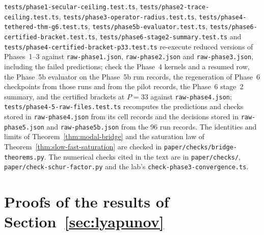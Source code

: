 \documentclass[11pt]{article}
\theoremstyle{remark}
\begin{document}
\begin{sloppypar}
\nolinkurl{tests/phase1-secular-ceiling.test.ts}, \nolinkurl{tests/phase2-trace-ceiling.test.ts}, \nolinkurl{tests/phase3-operator-radius.test.ts}, \nolinkurl{tests/phase4-tethered-thm-g6.test.ts}, \nolinkurl{tests/phase5b-evaluator.test.ts}, \nolinkurl{tests/phase6-certified-bracket.test.ts}, \nolinkurl{tests/phase6-stage2-summary.test.ts} and \nolinkurl{tests/phase4-certified-bracket-p33.test.ts} re-execute reduced versions of Phases~1--3 against \nolinkurl{raw-phase1.json}, \nolinkurl{raw-phase2.json} and \nolinkurl{raw-phase3.json}, including the failed predictions; check the Phase~4 kernels and a resumed row, the Phase~5b evaluator on the Phase~5b run records, the regeneration of Phase~6 checkpoints from those runs and from the pilot records, the Phase~6 stage~2 summary, and the certified brackets at $P=33$ against \nolinkurl{raw-phase4.json}; \nolinkurl{tests/phase4-5-raw-files.test.ts} recomputes the predictions and checks stored in \nolinkurl{raw-phase4.json} from its cell records and the decisions stored in \nolinkurl{raw-phase5.json} and \nolinkurl{raw-phase5b.json} from the 96 run records. The identities and limits of Theorem~\ref{thm:modal-bridge} and the saturation law of Theorem~\ref{thm:slow-fast-saturation} are checked in \nolinkurl{paper/checks/bridge-theorems.py}. The numerical checks cited in the text are in \nolinkurl{paper/checks/}, \nolinkurl{paper/check-schur-factor.py} and the lab's \nolinkurl{check-phase3-convergence.ts}.
\end{sloppypar}




\appendix
\section{Proofs of the results of Section~\ref{sec:lyapunov}}\label{app:thmFG}
\end{document}
